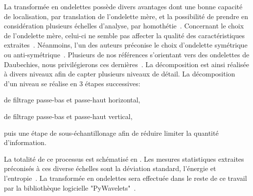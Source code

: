 La transformée en ondelettes possède divers avantages dont une bonne capacité de localisation, par translation de l'ondelette mère, et la possibilité de prendre en considération plusieurs échelles d'analyse, par homothétie~\cite{Livens1997,Wiltgen2008}. Concernant le choix de l'ondelette mère, celui-ci ne semble pas affecter la qualité des caractéristiques extraites~\cite{Fatemi1996, Livens1997}. Néanmoins, l'un des auteurs préconise le choix d'ondelette symétrique ou anti-symétrique~\cite{Livens1997}. Plusieurs de nos références s'orientant vers des ondelettes de Daubechies, nous privilégierons ces dernières~\cite{Wiltgen2008,Halimi2017a}. La décomposition est ainsi réalisée à divers niveaux afin de capter plusieurs niveaux de détail. La décomposition d'un niveau se réalise en 3 étapes successives: 
\begin{inlinerate}
    \item de filtrage passe-bas et passe-haut horizontal,
    \item de filtrage passe-bas et passe-haut vertical,
    \item puis une étape de sous-échantillonage afin de réduire limiter la quantité d'information.
\end{inlinerate} La totalité de ce processus est schématisé en . Les mesures statistiques extraites préconisés à ces diverse échelles sont la déviation standard, l'énergie et l'entropie~\cite{Livens1997, Wiltgen2008}. La transformée en ondelettes sera effectuée dans le reste de ce travail par la bibliothèque logicielle "PyWavelets"~\cite{lee2006}.\par

